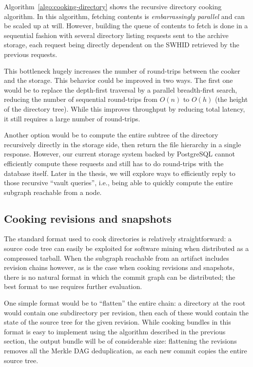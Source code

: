 Algorithm~\ref{algo:cooking-directory} shows the recursive directory cooking
algorithm.
In this algorithm, fetching contents is \emph{embarrassingly
parallel} and can be scaled up at will. However, building the queue of contents
to fetch is done in a sequential fashion with several directory listing
requests sent to the archive storage, each request being directly dependent on
the SWHID retrieved by the previous requests.

This bottleneck hugely increases the number of round-trips between the cooker
and the storage. This behavior could be improved in two ways. The first one
would be to replace the depth-first traversal by a parallel breadth-first
search, reducing the number of sequential round-trips from $O(n)$ to $O(h)$
(the height of the directory tree). While this improves throughput by reducing
total latency, it still requires a large number of round-trips.

Another option would be to compute the entire subtree of the directory
recursively directly in the storage side, then return the file hierarchy in a
single response. However, our current storage system backed by PostgreSQL
cannot efficiently compute these requests and still has to do round-trips with
the database itself. Later in the thesis, we will explore ways to efficiently
reply to those recursive ``vault queries'', i.e., being able to quickly compute
the entire subgraph reachable from a node.

\subsection{Cooking revisions and snapshots}

The standard format used to cook directories is relatively straightforward: a
source code tree can easily be exploited for software mining when distributed
as a compressed tarball. When the subgraph reachable from an artifact includes
revision chains however, as is the case when cooking revisions and snapshots,
there is no natural format in which the commit graph can be distributed; the
best format to use requires further evaluation.

One simple format would be to ``flatten'' the entire chain: a directory at the
root would contain one subdirectory per revision, then each of these would
contain the state of the source tree for the given revision. While cooking
bundles in this format is easy to implement using the algorithm described in
the previous section, the output bundle will be of considerable size:
flattening the revisions removes all the Merkle DAG deduplication, as each new
commit copies the entire source tree.

